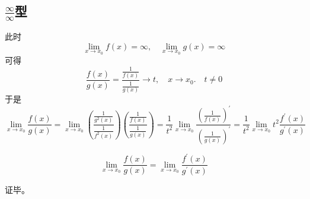 \documentclass{ctexart}
\begin{document}
\subsection*{$\frac{\infty}{\infty}$型}
此时
\begin{equation}\label{6}
  \lim\limits_{x \to x_{0}} f(x) = \infty, \quad \lim\limits_{x \to x_{0}} g(x) = \infty \tag{6}
\end{equation}
可得
\begin{equation}\label{7}
  \frac{f(x)}{g(x)} = \frac{\frac{1}{f(x)}}{\frac{1}{g(x)}} \to t, \quad x \to x_{0}. \quad t \neq 0   \tag{7}
\end{equation}
于是
\begin{equation}\label{8}
  \lim\limits_{x \to x_{0}} \frac{f(x)}{g(x)} =
  \lim\limits_{x \to x_{0}} (\frac{\frac{1}{g^{2}(x)}}{\frac{1}{f^{2}(x)}})
  (\frac{\frac{1}{f(x)}}{\frac{1}{g(x)}}) =
  \frac{1}{t^2} \lim\limits_{x \to x_{0}} \frac{(\frac{1}{f(x)})^{'}}{(\frac{1}{g(x)})^{'}} =
  \frac{1}{t^2} \lim\limits_{x \to x_{0}} t^2 \frac{f^{'}(x)}{g^{'}(x)}
  \tag{8}
\end{equation}

\begin{equation}\label{9}
  \lim\limits_{x \to x_{0}} \frac{f(x)}{g(x)} = \lim\limits_{x \to x_{0}} \frac{f^{'}(x)}{g^{'}(x)} \tag{9}
\end{equation}

证毕。
\end{document}
